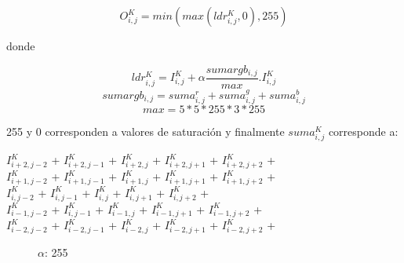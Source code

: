 \begin{center}
$$O_{i,j}^{K} = min(max(ldr_{i,j}^{K},0),255)$$
\end{center}

donde

\begin{center}
$$ldr_{i,j}^{K} = I_{i,j}^{K} + \alpha \frac{sumargb_{i,j}}{max} . I_{i,j}^{K}$$
$$sumargb_{i,j} = suma_{i,j}^{r} + suma_{i,j}^{g} + suma_{i,j}^{b}$$
$$max = 5*5*255*3*255$$
\end{center}

255 y 0 corresponden a valores de saturación y finalmente $suma_{i,j}^{K}$ corresponde a:

\begin{center}
$I_{i+2,j-2}^{K}$ + $I_{i+2,j-1}^{K}$ + $I_{i+2,j}^{K}$ + $I_{i+2,j+1}^{K}$ + $I_{i+2,j+2}^{K}$ +\\
$I_{i+1,j-2}^{K}$ + $I_{i+1,j-1}^{K}$ + $I_{i+1,j}^{K}$ + $I_{i+1,j+1}^{K}$ + $I_{i+1,j+2}^{K}$ +\\
$I_{i,j-2}^{K}$ + $I_{i,j-1}^{K}$ + $I_{i,j}^{K}$ + $I_{i,j+1}^{K}$ + $I_{i,j+2}^{K}$ +\\
$I_{i-1,j-2}^{K}$ + $I_{i,j-1}^{K}$ + $I_{i-1,j}^{K}$ + $I_{i-1,j+1}^{K}$ + $I_{i-1,j+2}^{K}$ +\\ 
$I_{i-2,j-2}^{K}$ + $I_{i-2,j-1}^{K}$ + $I_{i-2,j}^{K}$ + $I_{i-2,j+1}^{K}$ + $I_{i-2,j+2}^{K}$ +\\
\end{center}

\newpage

\begin{figure}
  \centering
  \hfill
  \caption{$\alpha$: 255}
\end{figure}


